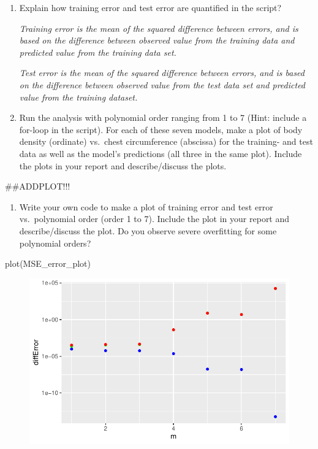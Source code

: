 \documentclass[
  letterpaper,
  DIV=11,
  numbers=noendperiod]{scrartcl}
\newenvironment{Shaded}{\begin{snugshade}}{\end{snugshade}}
\newcommand{\FunctionTok}[1]{\textcolor[rgb]{0.28,0.35,0.67}{#1}}
\newcommand{\NormalTok}[1]{\textcolor[rgb]{0.00,0.23,0.31}{#1}}
\providecommand{\tightlist}{%
  \setlength{\itemsep}{0pt}\setlength{\parskip}{0pt}}\usepackage{longtable,booktabs,array}
\begin{document}
\begin{enumerate}
\def\labelenumi{(\alph{enumi})}
\setcounter{enumi}{4}
\item
  Explain how training error and test error are quantified in the
  script?

  \emph{Training error is the mean of the squared difference between
  errors, and is based on the difference between observed value from the
  training data and predicted value from the training data set.}

  \emph{Test error is the mean of the squared difference between errors,
  and is based on the difference between observed value from the test
  data set and predicted value from the training dataset.}
\item
  Run the analysis with polynomial order ranging from 1 to 7 (Hint:
  include a for-loop in the script). For each of these seven models,
  make a plot of body density (ordinate) vs.~chest circumference
  (abscissa) for the training- and test data as well as the model's
  predictions (all three in the same plot). Include the plots in your
  report and describe/discuss the plots.
\end{enumerate}

\#\#ADDPLOT!!!

\begin{enumerate}
\def\labelenumi{(\alph{enumi})}
\setcounter{enumi}{6}
\tightlist
\item
  Write your own code to make a plot of training error and test error
  vs.~polynomial order (order 1 to 7). Include the plot in your report
  and describe/discuss the plot. Do you observe severe overfitting for
  some polynomial orders?
\end{enumerate}

\begin{Shaded}
\begin{Highlighting}[]
\FunctionTok{plot}\NormalTok{(MSE\_error\_plot)}
\end{Highlighting}
\end{Shaded}

\begin{figure}[H]

{\centering \includegraphics{excercise_doc_files/figure-pdf/unnamed-chunk-3-1.pdf}

}

\end{figure}
\end{document}

